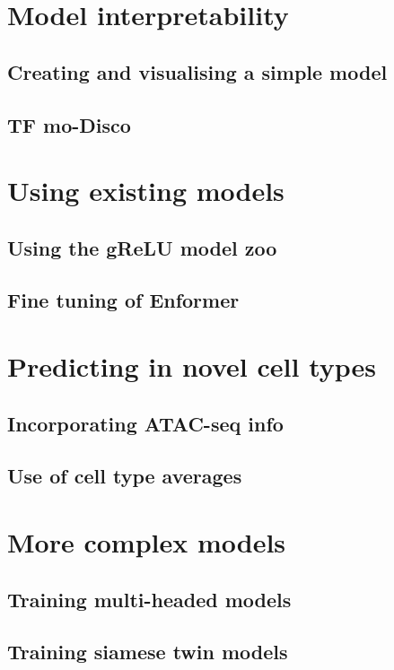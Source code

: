 \documentclass[
]{book}
\begin{document}
\part{Model interpretability}\label{part-model-interpretability}

\chapter{Creating and visualising a simple model}\label{creating-and-visualising-a-simple-model}

\chapter{TF mo-Disco}\label{tf-mo-disco}

\part{Using existing models}\label{part-using-existing-models}

\chapter{Using the gReLU model zoo}\label{using-the-grelu-model-zoo}

\chapter{Fine tuning of Enformer}\label{fine-tuning-of-enformer}

\part{Predicting in novel cell types}\label{part-predicting-in-novel-cell-types}

\chapter{Incorporating ATAC-seq info}\label{incorporating-atac-seq-info}

\chapter{Use of cell type averages}\label{use-of-cell-type-averages}

\part{More complex models}\label{part-more-complex-models}

\chapter{Training multi-headed models}\label{training-multi-headed-models}

\chapter{Training siamese twin models}\label{training-siamese-twin-models}

  
\end{document}
